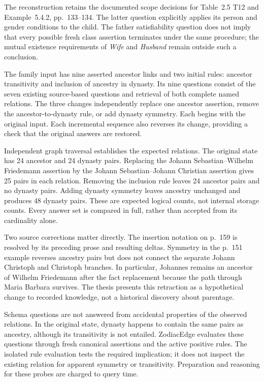 The reconstruction retains the documented scope decisions for Table~2.5 T12
and Example~5.4.2, pp.~133--134. The latter question explicitly applies its
person and gender conditions to the child. The father satisfiability question
does not imply that every possible fresh class assertion terminates under the
same procedure; the mutual existence requirements of \emph{Wife} and
\emph{Husband} remain outside such a conclusion.

The family input has nine asserted ancestor links and two initial rules:
ancestor transitivity and inclusion of ancestry in dynasty. Its nine questions
consist of the seven existing source-based questions and retrieval of both
complete named relations. The three changes independently replace one
ancestor assertion, remove the ancestor-to-dynasty rule, or add dynasty
symmetry. Each begins with the original input. Each incremental sequence also
reverses its change, providing a check that the original answers are restored.

Independent graph traversal establishes the expected relations. The original
state has 24 ancestor and 24 dynasty pairs. Replacing the Johann
Sebastian--Wilhelm Friedemann assertion by the Johann Sebastian--Johann
Christian assertion gives 25 pairs in each relation. Removing the inclusion
rule leaves 24 ancestor pairs and no dynasty pairs. Adding dynasty symmetry
leaves ancestry unchanged and produces 48 dynasty pairs. These are expected
logical counts, not internal storage counts. Every answer set is compared in
full, rather than accepted from its cardinality alone.

Two source corrections matter directly. The insertion notation on p.~159 is
resolved by its preceding prose and resulting deltas. Symmetry in the p.~151
example reverses ancestry pairs but does not connect the separate Johann
Christoph and Christoph branches. In particular, Johannes remains an ancestor
of Wilhelm Friedemann after the fact replacement because the path through
Maria Barbara survives. The thesis presents this retraction as a hypothetical
change to recorded knowledge, not a historical discovery about parentage.

Schema questions are not answered from accidental properties of the observed
relations. In the original state, dynasty happens to contain the same pairs
as ancestry, although its transitivity is not entailed. ZodiacEdge evaluates
these questions through fresh canonical assertions and the active positive
rules. The isolated rule evaluation tests the required implication; it does
not inspect the existing relation for apparent symmetry or transitivity.
Preparation and reasoning for these probes are charged to query time.

